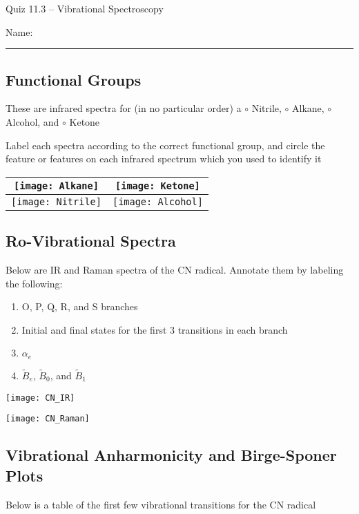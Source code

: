 \documentclass[11pt, letterpaper]{memoir}
\begin{document}
	\begin{center}
		{\large Quiz 11.3 -- Vibrational Spectroscopy}
	\end{center}
	{\large Name: \rule[-1mm]{4in}{.1pt} 

\subsection*{Functional Groups}
These are infrared spectra for (in no particular order) a $\circ$ Nitrile, $\circ$ Alkane, $\circ$ Alcohol, and $\circ$ Ketone

\noindent
Label each spectra according to the correct functional group, and circle the feature or features on each infrared spectrum which you used to identify it

\noindent
\begin{tabular}{c|c}
	\texttt{[image: Alkane]} & \texttt{[image: Ketone]} \\ \midrule
	\texttt{[image: Nitrile]} & \texttt{[image: Alcohol]}
\end{tabular}


\vspace{20em}
\subsection*{Ro-Vibrational Spectra}
	Below are IR and Raman spectra of the CN radical. Annotate them by labeling the following:
\begin{enumerate}
	\item O, P, Q, R, and S branches
	\item Initial and final states for the first 3 transitions in each branch
	\item $\alpha_e$	
	\item $\tilde{B}_e$, $\tilde{B}_0$, and $\tilde{B}_1$
\end{enumerate}

\noindent
\texttt{[image: CN\_IR]}

\noindent
\texttt{[image: CN\_Raman]}

\vspace{15em}
\subsection*{Vibrational Anharmonicity and Birge-Sponer Plots}
Below is a table of the first few vibrational transitions for the CN radical

}
\end{document}
